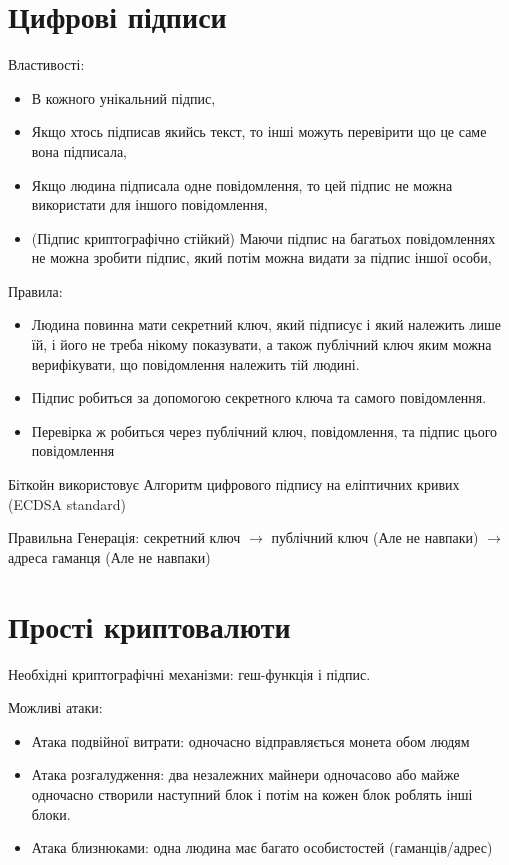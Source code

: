\documentclass{article}
\begin{document}
    \newpage
    \section{Цифрові підписи}

    Властивості:
    \begin{itemize}
        \item В кожного унікальний підпис,
        \item Якщо хтось підписав якийсь текст, то інші можуть перевірити що це саме вона підписала,
        \item Якщо людина підписала одне повідомлення, то цей підпис не можна використати для іншого повідомлення,
        \item (Підпис криптографічно стійкий) Маючи підпис на багатьох повідомленнях не можна зробити підпис, який потім можна видати за підпис іншої особи,
    \end{itemize}
    Правила:
    \begin{itemize}
        \item Людина повинна мати секретний ключ, який підписує і який належить лише їй, і його не треба нікому показувати, а також публічний ключ яким можна верифікувати, що повідомлення належить тій людині.
        \item Підпис робиться за допомогою секретного ключа та самого повідомлення.
        \item Перевірка ж робиться через публічний ключ, повідомлення, та підпис цього повідомлення
    \end{itemize}

    Біткойн використовує Алгоритм цифрового підпису на еліптичних кривих (ECDSA standard)

    Правильна Генерація: секретний ключ $\rightarrow$ публічний ключ (Але не навпаки) $\rightarrow$ адреса гаманця (Але не навпаки)

    \newpage
    \section{Прості криптовалюти}

    Необхідні криптографічні механізми: геш-функція і підпис.

    Можливі атаки:
    \begin{itemize}
        \item Атака подвійної витрати: одночасно відправляється монета обом людям 
        \item Атака розгалудження: два незалежних майнери одночасово або майже одночасно створили наступний блок і потім на кожен блок роблять інші блоки.
        \item Атака близнюками: одна людина має багато особистостей (гаманців/адрес)
    \end{itemize}
\end{document}
